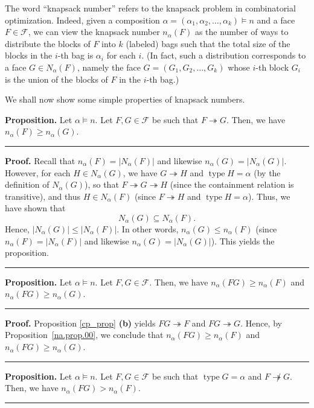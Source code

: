 \documentclass[12pt]{article}
\theoremstyle{definition}%
\newtheorem{prop}[thm]{Proposition}
\theoremstyle{definition}%
\theoremstyle{remark}%
\newcommand{\tup}[1]{\left( #1 \right)}
\newcommand{\card}[1]{\left| #1 \right|} %
\newcommand{\CF}{\mathcal{F}}
\newcommand{\na}{n_{ \alpha } }%
\newcommand{\Na}{N_{ \alpha } }%
\newcommand{\type}{\operatorname{type}}
\newcommand{\con}{\twoheadrightarrow} %
\newenvironment{prop}[1][Proposition]{\noindent\textbf{#1.} }{\ \rule{0.5em}{0.5em}}
\newenvironment{proof}[1][Proof]{\noindent\textbf{#1.} }{\ \rule{0.5em}{0.5em}}
\begin{document}
The word ``knapsack number'' refers to the knapsack problem in combinatorial optimization.
Indeed, given a composition $\alpha = \tup{\alpha_1, \alpha_2, \ldots, \alpha_k} \models n$ and a face $F \in \CF$, we can view the knapsack number $\na\tup{F}$ as the number of ways to distribute the blocks of $F$ into $k$ (labeled) bags such that the total size of the blocks in the $i$-th bag is $\alpha_i$ for each $i$.
(In fact, such a distribution corresponds to a face $G \in \Na\tup{F}$, namely the face $G = \tup{G_1, G_2, \ldots, G_k}$ whose $i$-th block $G_i$ is the union of the blocks of $F$ in the $i$-th bag.)

We shall now show some simple properties of knapsack numbers.

\begin{prop}
    \label{na.prop.00}
    Let $\alpha \models n$.
	Let $F,G \in \CF$ be such that $F \con G$.
    Then, we have $\na\tup{F} \geq \na\tup{G}$.
\end{prop}

\begin{proof}
   Recall that $\na\tup{F} = \card{\Na\tup{F}}$ and
   likewise $\na\tup{G} = \card{\Na\tup{G}}$.
   However, for each $H \in \Na\tup{G}$, we have
   $G \con H$ and $\type H = \alpha$ (by the definition
   of $\Na\tup{G}$), so that
   $F \con G \con H$
   (since the containment relation is transitive),
   and thus $H \in \Na\tup{F}$ (since $F \con H$ and
   $\type H = \alpha$).
   Thus, we have shown that
   \[
   \Na\tup{G}
   \subseteq
   \Na\tup{F}.
   \]
   Hence,
   $\card{\Na\tup{G}}
   \leq
   \card{\Na\tup{F}}$.
   In other words, $\na\tup{G} \le \na\tup{F}$
   (since $\na\tup{F} = \card{\Na\tup{F}}$ and
   likewise $\na\tup{G} = \card{\Na\tup{G}}$).
   This yields the proposition.
\end{proof}

\begin{prop}
    \label{na.prop.0}
    Let $\alpha \models n$.
	Let $F,G \in \CF$.
    Then, we have $\na\tup{FG} \geq \na\tup{F}$ and $\na\tup{FG} \geq \na\tup{ G }$.
\end{prop}

\begin{proof}
    Proposition \ref{cp_prop} \textbf{(b)} yields $FG \con F$ and $FG \con G$.
    Hence, by Proposition~\ref{na.prop.00}, we conclude that
    $\na\tup{FG} \geq \na\tup{F}$ and $\na\tup{FG} \geq \na\tup{ G }$.
\end{proof}

\begin{prop}
    \label{na.prop.1}
    Let $\alpha \models n$.
	Let $F,G \in \CF$ be such that $\type G = \alpha$ and $F \not\con G$.
	Then, we have $\na\tup{FG} > \na\tup{F}$.
\end{prop}
\end{document}
